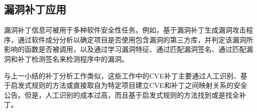 \subsection{漏洞补丁应用}
漏洞补丁信息可被用于多种软件安全性任务。例如，基于漏洞补丁生成漏洞攻击程序\cite{brumley2008automatic,you2017semfuzz}，通过软件成分分析以确定项目是否使用包含漏洞的第三方库，并判定该漏洞所影响的函数是否被调用\cite{pashchenko2018vulnerable,ponta2020detection,pashchenko2020vuln4real,Wang2020empirical}，以及通过学习漏洞特征\cite{li2016vulpecker,li2018vuldeepecker,zhou2019devign,jimenez2019importance}、通过匹配漏洞签名\cite{jang2012redebug,kim2017vuddy}、通过匹配漏洞和补丁检测签名\cite{xu2020patch,xiao2020mvp,cui2020vuldetector}来检测程序中的漏洞。


与上一小结的补丁分析工作类似，这些工作中的CVE补丁主要通过人工识别\cite{pashchenko2018vulnerable,ponta2020detection,pashchenko2020vuln4real,xiao2020mvp}、基于启发式规则的方法\cite{li2016vulpecker,li2018vuldeepecker,you2017semfuzz,Wang2020empirical,jimenez2019importance}或直接取自为特定项目建立CVE和补丁之间映射关系的安全公告\cite{jang2012redebug,kim2017vuddy,xu2020patch}。但是，人工识别的成本过高，而且基于启发式规则的方法找到或是找全补丁。